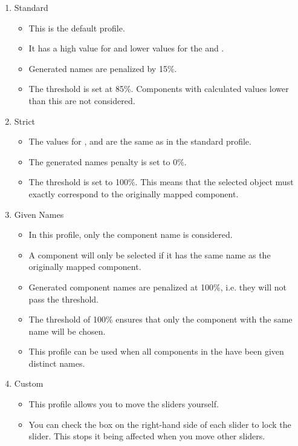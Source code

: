\begin{enumerate}
\item Standard
\begin{itemize}
\item This is the default profile.
\item It has a high value for  and lower values for the  and .
\item Generated names are penalized by 15\%.
\item The threshold is set at 85\%. Components with calculated values lower than this are not considered. 
\end{itemize}

\item Strict
\begin{itemize}
\item The values for ,  and  are the same as in the standard profile.
\item The generated names penalty is set to 0\%.
\item The threshold is set to 100\%. This means that the selected object must exactly correspond to the originally mapped component. 
\end{itemize}

\item Given Names
\begin{itemize}
\item In this profile, only the component name is considered.
\item A component will only be selected if it has the same name as the originally mapped component. 
\item Generated component names are penalized at 100\%, i.e. they will not pass the threshold.
\item The threshold of 100\% ensures that only the component with the same name will be chosen. 
\item This profile can be used when all components in the \gdaut{} have been given distinct names. 
\end{itemize}

\item Custom
\begin{itemize}
\item This profile allows you to move the sliders yourself.
\item You can check the box on the right-hand side of each slider to lock the slider. This stops it being affected when you move other sliders. 
\end{itemize}


\end{enumerate}
